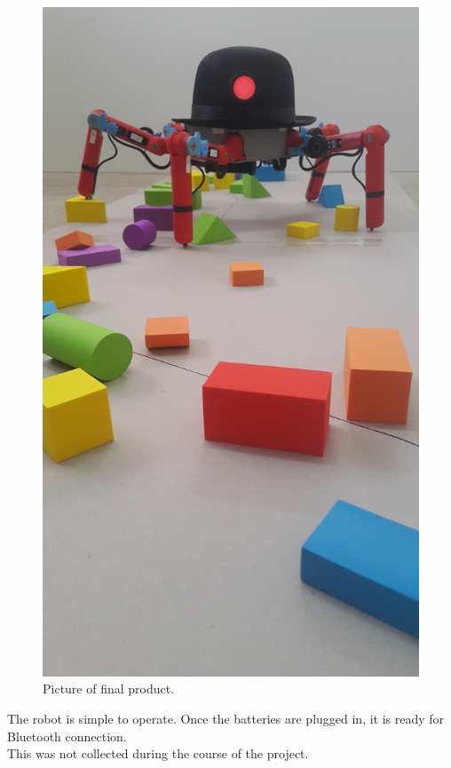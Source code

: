 \begin{figure}[H]
\centering
\includegraphics[angle = 270,scale = 0.1]{pics/KRL2.jpg}
\caption{Picture of final product.}
\end{figure}

The robot is simple to operate. Once the batteries are plugged in, it is ready for Bluetooth connection.\\
This was not collected during the course of the project.\\

